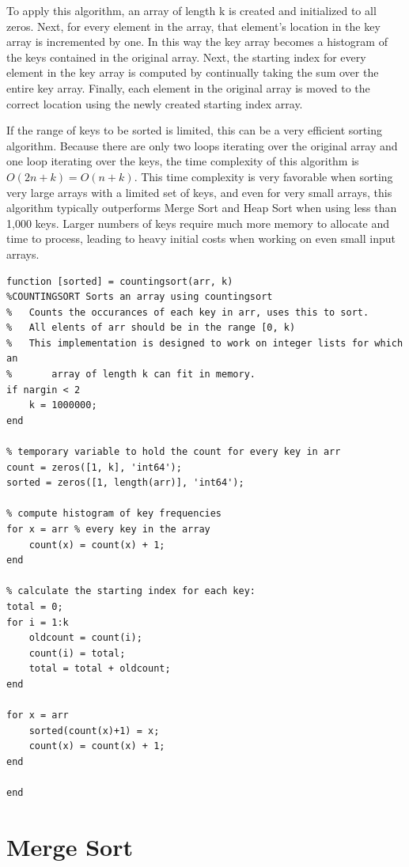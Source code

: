 \documentclass[a4paper]{article}
\begin{document}
To apply this algorithm, an array of length k is created and initialized to all zeros. Next, for every element in the array, that element’s location in the key array is incremented by one. In this way the key array becomes a histogram of the keys contained in the original array. Next, the starting index for every element in the key array is computed by continually taking the sum over the entire key array. Finally, each element in the original array is moved to the correct location using the newly created starting index array.

If the range of keys to be sorted is limited, this can be a very efficient sorting algorithm. Because there are only two loops iterating over the original array and one loop iterating over the keys, the time complexity of this algorithm is $O(2n + k) = O(n + k)$. This time complexity is very favorable when sorting very large arrays with a limited set of keys, and even for very small arrays, this algorithm typically outperforms Merge Sort and Heap Sort when using less than 1,000 keys. Larger numbers of keys require much more memory to allocate and time to process, leading to heavy initial costs when working on even small input arrays.

\begin{lstlisting}
function [sorted] = countingsort(arr, k)
%COUNTINGSORT Sorts an array using countingsort
%   Counts the occurances of each key in arr, uses this to sort.
%   All elents of arr should be in the range [0, k)
%   This implementation is designed to work on integer lists for which an
%       array of length k can fit in memory.
if nargin < 2
    k = 1000000;
end

% temporary variable to hold the count for every key in arr
count = zeros([1, k], 'int64');
sorted = zeros([1, length(arr)], 'int64');

% compute histogram of key frequencies
for x = arr % every key in the array
    count(x) = count(x) + 1;
end

% calculate the starting index for each key:
total = 0;
for i = 1:k
    oldcount = count(i);
    count(i) = total;
    total = total + oldcount;
end

for x = arr
    sorted(count(x)+1) = x;
    count(x) = count(x) + 1;
end

end

\end{lstlisting}


\section{Merge Sort}
\end{document}

